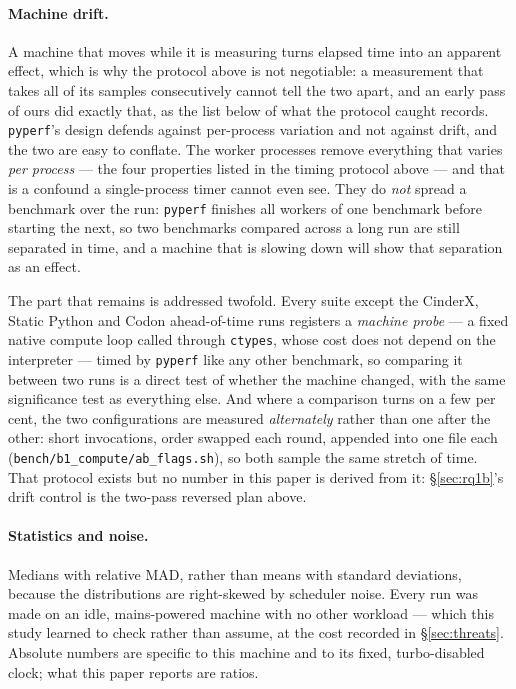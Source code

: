 \documentclass[10pt,a4paper]{article}
\newcommand{\code}[1]{\texttt{\small #1}}
\begin{document}
\paragraph{Machine drift.}
A machine that moves while it is measuring turns elapsed time into an apparent effect, which is
why the protocol above is not negotiable: a measurement that takes all of its samples
consecutively cannot tell the two apart, and an early pass of ours did exactly that, as the list
below of what the protocol caught records. \code{pyperf}'s design defends against per-process
variation and not against drift, and the two are easy to conflate. The worker
processes remove everything that varies \emph{per process} --- the four properties listed
in the timing protocol above --- and that is a confound a single-process timer cannot even see. They do \emph{not} spread a benchmark over the run: \code{pyperf} finishes all
workers of one benchmark before starting the next, so two benchmarks compared across a
long run are still separated in time, and a machine that is slowing down will show that
separation as an effect.

The part that remains is addressed twofold. Every suite except the CinderX, Static Python
and Codon ahead-of-time runs registers a \emph{machine probe} --- a
fixed native compute loop called through \code{ctypes}, whose cost does not depend on the
interpreter --- timed by \code{pyperf} like any other benchmark, so comparing it between two
runs is a direct test of whether the machine changed, with the same significance test as
everything else. And where a comparison turns on a few per cent, the two configurations are
measured \emph{alternately} rather than one after the other: short invocations, order swapped
each round, appended into one file each (\code{bench/b1\_compute/ab\_flags.sh}), so both sample
the same stretch of time. That protocol exists but no number in this paper is derived from it:
\S\ref{sec:rq1b}'s drift control is the two-pass reversed plan above.

\paragraph{Statistics and noise.}
Medians with relative MAD, rather than means with standard deviations, because the
distributions are right-skewed by scheduler noise. Every run was made on an idle, mains-powered
machine with no other workload --- which this study learned to check rather than assume,
at the cost recorded in \S\ref{sec:threats}. Absolute numbers are specific to this machine and to its fixed,
turbo-disabled clock; what this paper reports are ratios.
\end{document}
